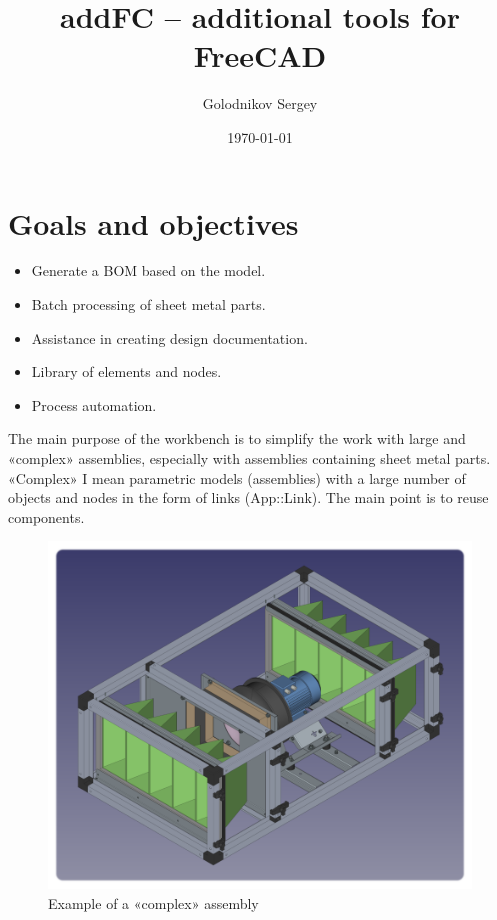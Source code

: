 \documentclass[a4paper,12pt]{article}
\title{addFC -- additional tools for FreeCAD}
\author{Golodnikov Sergey}
\date{\today}
\begin{document}
\maketitle




\section{Goals and objectives}

\begin{itemize}
	\item Generate a BOM based on the model.
	\item Batch processing of sheet metal parts.
	\item Assistance in creating design documentation.
	\item Library of elements and nodes.
	\item Process automation.\\
\end{itemize}

The main purpose of the workbench is to simplify the work with large and «complex» assemblies, especially with assemblies containing sheet metal parts. «Complex» I mean parametric models (assemblies) with a large number of objects and nodes in the form of links (App::Link). The main point is to reuse components.

\begin{figure}[htp]
	\centering
	\includegraphics[scale=0.46]{img/assembly_example.png}
	\caption{Example of a «complex» assembly}
	\label{sec:assembly_example}
\end{figure}
\end{document}
